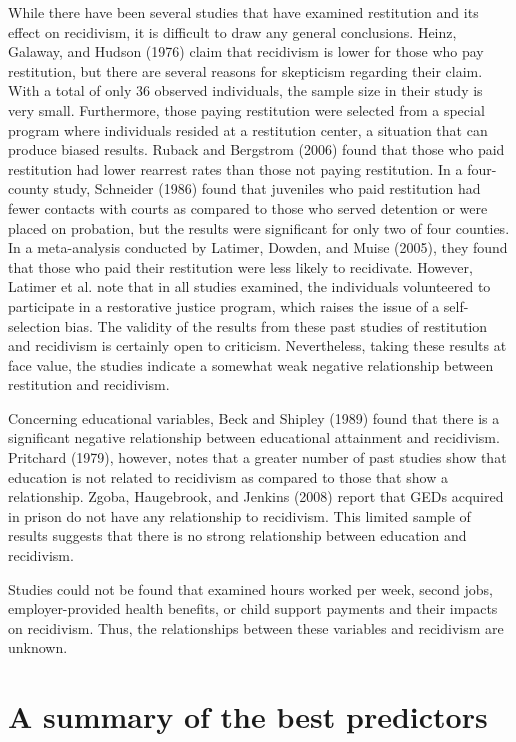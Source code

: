 While there have been several studies that have examined restitution and its effect on recidivism, it is difficult to draw any general conclusions.  Heinz, Galaway, and Hudson (1976) claim that recidivism is lower for those who pay restitution, but there are several reasons for skepticism regarding their claim.  With a total of only 36 observed individuals, the sample size in their study is very small.  Furthermore, those paying restitution were selected from a special program where individuals resided at a restitution center, a situation that can produce biased results.  Ruback and Bergstrom (2006) found that those who paid restitution had lower rearrest rates than those not paying restitution.  In a four-county study, Schneider (1986) found that juveniles who paid restitution had fewer contacts with courts as compared to those who served detention or were placed on probation, but the results were significant for only two of four counties.  In a meta-analysis conducted by Latimer, Dowden, and Muise (2005), they found that those who paid their restitution were less likely to recidivate.  However, Latimer et al. note that in all studies examined, the individuals volunteered to participate in a restorative justice program, which raises the issue of a self-selection bias.  The validity of the results from these past studies of restitution and recidivism is certainly open to criticism.  Nevertheless, taking these results at face value, the studies indicate a somewhat weak negative relationship between restitution and recidivism.

Concerning educational variables, Beck and Shipley (1989) found that there is a significant negative relationship between educational attainment and recidivism.  Pritchard (1979), however, notes that a greater number of past studies show that education is not related to recidivism as compared to those that show a relationship.  Zgoba, Haugebrook, and Jenkins (2008) report that GEDs acquired in prison do not have any relationship to recidivism.  This limited sample of results suggests that there is no strong relationship between education and recidivism.

Studies could not be found that examined hours worked per week, second jobs, employer-provided health benefits, or child support payments and their impacts on recidivism.  Thus, the relationships between these variables and recidivism are unknown.

\section{A summary of the best predictors}

